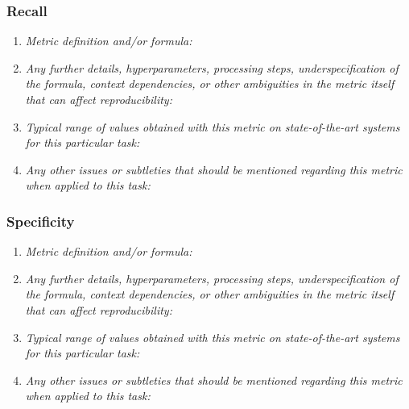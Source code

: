 \documentclass[a4paper,11pt]{article}
\begin{document}
        \subsubsection{Recall}
            \begin{enumerate}[label=\alph*.]
                \item \textit{Metric definition and/or formula:}
                \bigskip
                \item \textit{Any further details, hyperparameters, processing steps, underspecification of the formula, context dependencies, or other ambiguities in the metric itself that can affect reproducibility:}
                \bigskip
                \item \textit{Typical range of values obtained with this metric on state-of-the-art systems for this particular task:}
                \bigskip
                \item \textit{Any other issues or subtleties that should be mentioned regarding this metric when applied to this task:}
                \bigskip
            \end{enumerate}
        \subsubsection{Specificity}
            \begin{enumerate}[label=\alph*.]
                \item \textit{Metric definition and/or formula:}
                \bigskip
                \item \textit{Any further details, hyperparameters, processing steps, underspecification of the formula, context dependencies, or other ambiguities in the metric itself that can affect reproducibility:}
                \bigskip
                \item \textit{Typical range of values obtained with this metric on state-of-the-art systems for this particular task:}
                \bigskip
                \item \textit{Any other issues or subtleties that should be mentioned regarding this metric when applied to this task:}
                \bigskip
            \end{enumerate}
\end{document}
